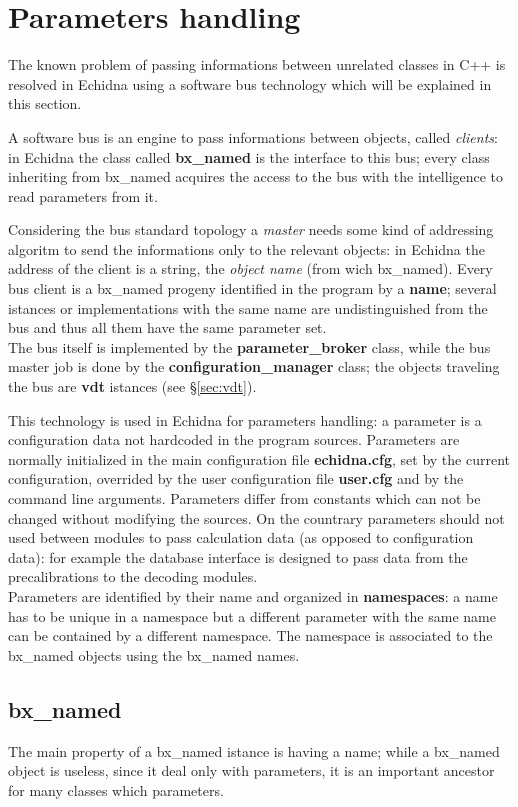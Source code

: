 \section{Parameters handling}
\label{sec:parameters}
The known problem of passing informations between unrelated classes in C++ is resolved
in Echidna using a software bus technology which will be explained in this section.

A software bus is an engine to pass informations between objects, called {\it clients}:
in Echidna the class called {\bf bx\_named} is the interface to this bus; every class 
inheriting from bx\_named acquires the access to the bus with the intelligence to read 
parameters from it.

Considering the bus standard topology a {\it master} needs some kind of addressing algoritm to send
the informations only to the relevant objects: in Echidna the address of the client is 
a string, the {\it object name} (from wich bx\_named).
Every bus client is a bx\_named progeny identified in the program by a 
{\bf name}; several istances or implementations with the same name are undistinguished 
from the bus and thus all them have the same parameter set.\\
The bus itself is implemented by the {\bf parameter\_broker} class, while the bus master
job is done by the {\bf configuration\_manager} class; the objects traveling the bus
are {\bf vdt} istances (see \S\ref{sec:vdt}).

This technology is used in Echidna for parameters handling: a parameter is a configuration 
data not hardcoded in the program sources. Parameters are normally initialized in the main
configuration file {\bf echidna.cfg}, set by the current configuration, overrided by the
user configuration file {\bf user.cfg} and by the command line arguments. Parameters differ
from constants which can not be changed without modifying the sources. On the countrary
parameters should not used between modules to pass calculation data (as opposed to 
configuration data): for example the database interface is designed to pass data from 
the precalibrations to the decoding modules.\\
Parameters are identified by their name and organized in {\bf namespaces}: a name has
to be unique in a namespace but a different parameter with the same name can be contained
by a different namespace. The namespace is associated to the bx\_named objects using the
bx\_named names.

\subsection{bx\_named}
The main property of a bx\_named istance is having a name; while a bx\_named object is
useless, since it deal only with parameters, it is an important ancestor for many classes
which parameters.

